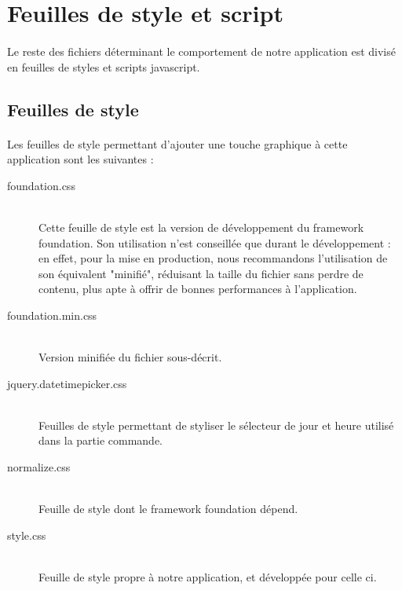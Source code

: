 \section{Feuilles de style et script}
    \paragraph{}
        Le reste des fichiers déterminant le comportement de notre application
        est divisé en feuilles de styles et scripts javascript.
    \subsection{Feuilles de style}
        \paragraph{}
            Les feuilles de style permettant d'ajouter une touche graphique à
            cette application sont les suivantes :
        \begin{description}
            \item[foundation.css]\hfill \\
                Cette feuille de style est la version de développement du
                framework foundation.
                Son utilisation n'est conseillée que durant le développement : 
                en effet, pour la mise en production, nous recommandons
                l'utilisation de son équivalent "minifié", réduisant la taille
                du fichier sans perdre de contenu, plus apte à offrir de bonnes
                performances à l'application.
            \item[foundation.min.css]\hfill \\
                Version minifiée du fichier sous-décrit.
            \item[jquery.datetimepicker.css]\hfill \\
                Feuilles de style permettant de styliser le sélecteur de
                jour et heure utilisé dans la partie commande.
            \item[normalize.css]\hfill \\
                Feuille de style dont le framework foundation dépend.
            \item[style.css]\hfill \\
                Feuille de style propre à notre application, et développée
                pour celle ci.
        \end{description}
